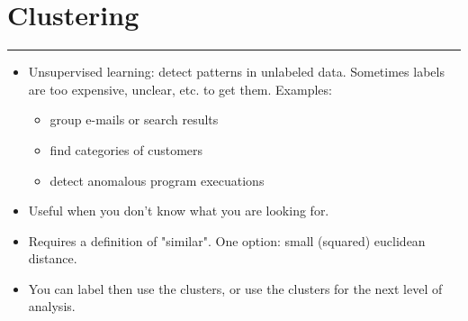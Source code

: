 \section{Clustering}
\smallskip \hrule height 2pt \smallskip

\begin{itemize}
	\item Unsupervised learning: detect patterns in unlabeled data. 
		Sometimes labels are too expensive, unclear, etc. to get them.
		Examples:
		\begin{itemize}
			\item group e-mails or search results
			\item find categories of customers
			\item detect anomalous program execuations
		\end{itemize}
	\item Useful when you don't know what you are looking for. 
	\item Requires a definition of "similar".  One option: small (squared) euclidean distance. 
	\item You can label then use the clusters, or use the clusters for the next level of analysis.
\end{itemize}

